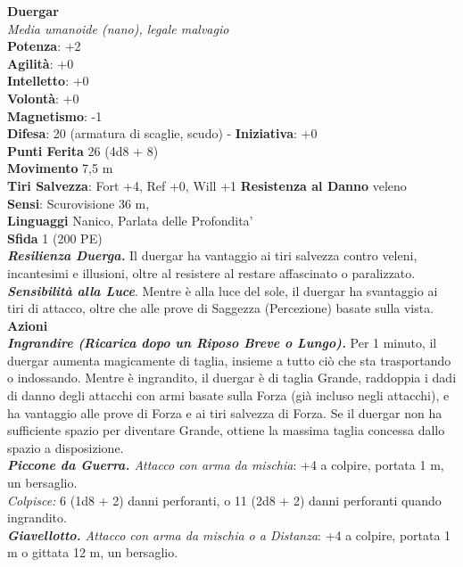 \begin{multicols}{2}
\medskip\textbf{Duergar}\\
\emph{Media umanoide (nano), legale malvagio}\\
\textbf{Potenza}: +2\\
\textbf{Agilità}: +0\\
\textbf{Intelletto}: +0\\
\textbf{Volontà}: +0\\
\textbf{Magnetismo}: -1\\
\textbf{Difesa}: 20 (armatura di scaglie, scudo) - \textbf{Iniziativa}: +0\\
\textbf{Punti Ferita} 26 (4d8 + 8)\\
\textbf{Movimento} 7,5 m\\
\textbf{Tiri Salvezza}: Fort +4, Ref +0, Will +1
\textbf{Resistenza al Danno} veleno\\
\textbf{Sensi}: Scurovisione 36 m, \\
\textbf{Linguaggi} Nanico, Parlata delle Profondita'\\
\textbf{Sfida} 1 (200 PE)\smallskip\\
\emph{\textbf{Resilienza Duerga.}} Il duergar ha vantaggio ai tiri salvezza contro veleni, incantesimi e illusioni, oltre al resistere al restare affascinato o paralizzato.\\
\emph{\textbf{Sensibilità alla Luce}}. Mentre è alla luce del sole, il duergar ha svantaggio ai tiri di attacco, oltre che alle prove di Saggezza (Percezione) basate sulla vista.\\
\smallskip\textbf{Azioni}\\
\emph{\textbf{Ingrandire (Ricarica dopo un Riposo Breve o Lungo).}} Per 1 minuto, il duergar aumenta magicamente di taglia, insieme a tutto ciò che sta trasportando o indossando. Mentre è ingrandito, il duergar è di taglia Grande, raddoppia i dadi di danno degli attacchi con armi basate sulla Forza (già incluso negli attacchi), e ha vantaggio alle prove di Forza e ai tiri salvezza di Forza. Se il duergar non ha sufficiente spazio per diventare Grande, ottiene la massima taglia concessa dallo spazio a disposizione.\\
\emph{\textbf{Piccone da Guerra.} Attacco con arma da mischia}: +4 a colpire, portata 1 m, un bersaglio.\\
\emph{Colpisce:} 6 (1d8 + 2) danni perforanti, o 11 (2d8 + 2) danni perforanti quando ingrandito.\\
\emph{\textbf{Giavellotto.} Attacco con arma da mischia o a Distanza}: +4 a colpire, portata 1 m o gittata 12 m, un bersaglio.\\

\end{multicols}
